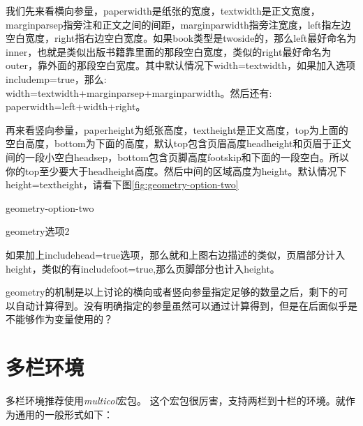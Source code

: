 \documentclass[11pt,oneside]{book}
\begin{document}
  我们先来看横向参量，paperwidth是纸张的宽度，textwidth是正文宽度，marginparsep指旁注和正文之间的间距，marginparwidth指旁注宽度，left指左边空白宽度，right指右边空白宽度。如果book类型是twoside的，那么left最好命名为inner，也就是类似出版书籍靠里面的那段空白宽度，类似的right最好命名为outer，靠外面的那段空白宽度。其中默认情况下width=textwidth，如果加入选项\\includemp=true，那么:\\width=textwidth+marginparsep+marginparwidth。然后还有:\\paperwidth=left+width+right。

  再来看竖向参量，paperheight为纸张高度，textheight是正文高度，top为上面的空白高度，bottom为下面的高度，默认top包含页眉高度headheight和页眉于正文间的一段小空白headsep，bottom包含页脚高度footskip和下面的一段空白。所以你的top至少要大于headheight高度。然后中间的区域高度为height。默认情况下height=textheight，请看下图\ref{fig:geometry-option-two}

  \begin{linefig}{geometry-option-two}
    \caption{geometry选项2}
    \label{fig:geometry-option-two}
  \end{linefig}

  如果加上includehead=true选项，那么就和上图右边描述的类似，页眉部分计入height，类似的有includefoot=true,那么页脚部分也计入height。

  geometry的机制是以上讨论的横向或者竖向参量指定足够的数量之后，剩下的可以自动计算得到。没有明确指定的参量虽然可以通过计算得到，但是在后面似乎是不能够作为变量使用的？




  \section{多栏环境}
  多栏环境推荐使用\emph{multicol}宏包。
  这个宏包很厉害，支持两栏到十栏的环境。就作为通用的一般形式如下：
\end{document}
